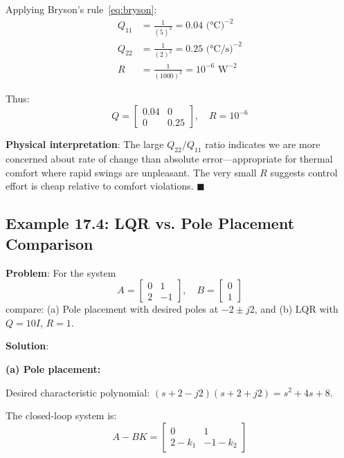 Applying Bryson's rule~\eqref{eq:bryson}:
\begin{align}
Q_{11} &= \frac{1}{(5)^2} = 0.04 \text{ (°C)}^{-2} \\
Q_{22} &= \frac{1}{(2)^2} = 0.25 \text{ (°C/s)}^{-2} \\
R &= \frac{1}{(1000)^2} = 10^{-6} \text{ W}^{-2}
\end{align}

Thus:
\begin{equation}
Q = \begin{bmatrix} 0.04 & 0 \\ 0 & 0.25 \end{bmatrix}, \quad R = 10^{-6}
\end{equation}

\textbf{Physical interpretation}: The large $Q_{22}/Q_{11}$ ratio indicates we are more concerned about rate of change than absolute error---appropriate for thermal comfort where rapid swings are unpleasant. The very small $R$ suggests control effort is cheap relative to comfort violations. $\blacksquare$

\subsection{Example 17.4: LQR vs. Pole Placement Comparison}

\textbf{Problem}: For the system
\begin{equation}
A = \begin{bmatrix} 0 & 1 \\ 2 & -1 \end{bmatrix}, \quad B = \begin{bmatrix} 0 \\ 1 \end{bmatrix}
\end{equation}
compare: (a) Pole placement with desired poles at $-2 \pm j2$, and (b) LQR with $Q = 10I$, $R = 1$.

\textbf{Solution}:

\textbf{(a) Pole placement:}

Desired characteristic polynomial: $(s+2-j2)(s+2+j2) = s^2 + 4s + 8$.

The closed-loop system is:
\begin{equation}
A - BK = \begin{bmatrix} 0 & 1 \\ 2-k_1 & -1-k_2 \end{bmatrix}
\end{equation}

